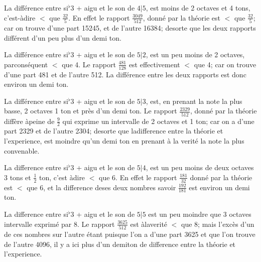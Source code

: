 \documentclass[11pt,a4paper]{article}
\begin{document}
La différence entre si$^{\flat}$3 + aigu et le son de $4|5$, est moins
de 2 octaves et 4 tons, c'est-àdire $<$ que $\frac{32}{5}$. En effet le rapport
$\frac{3049}{512}$, donné par la théorie est $<$ que $\frac{32}{5}$; car on trouve d'une
part 15245, et de l'autre 16384; desorte que les deux rapports
différent d'un peu plus d'un demi ton.

La différence entre si$^{\flat}$3 + aigu et le son de $5|2$, est un peu
moins de 2 octaves, parconséquent $<$ que 4.  Le rapport
$\frac{481}{128}$ est effectivement $<$ que 4; car on trouve d'une part
481 et de l'autre 512.  La différence entre les deux rapports
est donc environ un demi ton.

La différence entre si$^{\flat}$3 + aigu et le son de $5|3$, est, en prenant
la note la plus basse, 2 octaves 1 ton et près d'un demi ton.
Le rapport $\frac{2329}{512}$, donné par la théorie diffère àpeine de $\frac{9}{2}$
qui exprime un intervalle de 2 octaves et 1 ton; car on a d'une
part 2329 et de l'autre 2304; desorte que ladifference entre la
théorie et l'experience, est moindre qu'un demi ton en prenant à la verité la note la plus
convenable.


La difference entre si$^{\flat}$3 + aigu et le son de $5|4$, est un peu
moins de deux octaves 3 tons et $\frac{1}{2}$ ton, c'est àdire $<$ que 6.
En effet le rapport $\frac{181}{32}$ donné par la théorie est $<$ que 6,
et la difference deses deux nombres savoir $\frac{192}{181}$ est 
environ un demi ton.

La difference entre si$^{\flat}$3 + aigu et le son de $5|5$ est un peu
moindre que  3 octaves intervalle exprimé par 8.
Le rapport $\frac{3625}{512}$ est àlaverité $<$ que 8; mais l'excès d'un
de ces nombres sur l'autre étant    puisque
l'on  a d'une part 3625 et que l'on trouve de
l'autre 4096, il y a ici plus d'un demiton de difference
entre la théorie et l'experience.
\end{document}
